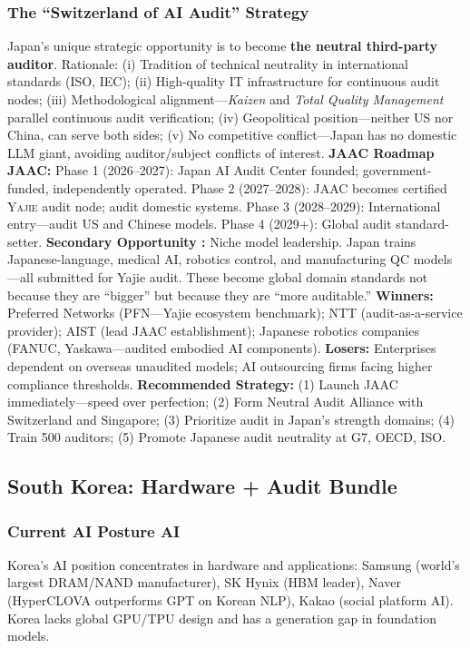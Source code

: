 \documentclass[11pt,a4paper]{article}
\theoremstyle{definition}
\theoremstyle{remark}
\newcommand{\Yajie}{\textsc{Yajie}}
\begin{document}
\subsubsection{The ``Switzerland of AI Audit'' Strategy }
Japan's unique strategic opportunity is to become \textbf{the neutral third-party auditor}. Rationale: (i) Tradition of technical neutrality in international standards (ISO, IEC); (ii) High-quality IT infrastructure for continuous audit nodes; (iii) Methodological alignment---\textit{Kaizen} and \textit{Total Quality Management} parallel continuous audit verification; (iv) Geopolitical position---neither US nor China, can serve both sides; (v) No competitive conflict---Japan has no domestic LLM giant, avoiding auditor/subject conflicts of interest.
\textbf{JAAC Roadmap JAAC:}
Phase 1 (2026--2027): Japan AI Audit Center founded; government-funded, independently operated. Phase 2 (2027--2028): JAAC becomes certified \Yajie{} audit node; audit domestic systems. Phase 3 (2028--2029): International entry---audit US and Chinese models. Phase 4 (2029+): Global audit standard-setter.
\textbf{Secondary Opportunity :} Niche model leadership. Japan trains Japanese-language, medical AI, robotics control, and manufacturing QC models---all submitted for Yajie audit. These become global domain standards not because they are ``bigger'' but because they are ``more auditable.''
\textbf{Winners:} Preferred Networks (PFN---Yajie ecosystem benchmark); NTT (audit-as-a-service provider); AIST (lead JAAC establishment); Japanese robotics companies (FANUC, Yaskawa---audited embodied AI components).
\textbf{Losers:} Enterprises dependent on overseas unaudited models; AI outsourcing firms facing higher compliance thresholds.
\textbf{Recommended Strategy:} (1) Launch JAAC immediately---speed over perfection; (2) Form Neutral Audit Alliance with Switzerland and Singapore; (3) Prioritize audit in Japan's strength domains; (4) Train 500 auditors; (5) Promote Japanese audit neutrality at G7, OECD, ISO.
\subsection{South Korea: Hardware + Audit Bundle}
\label{sec:korea}
\subsubsection{Current AI Posture AI}
Korea's AI position concentrates in hardware and applications: Samsung (world's largest DRAM/NAND manufacturer), SK Hynix (HBM leader), Naver (HyperCLOVA outperforms GPT on Korean NLP), Kakao (social platform AI). Korea lacks global GPU/TPU design and has a generation gap in foundation models.
\end{document}
